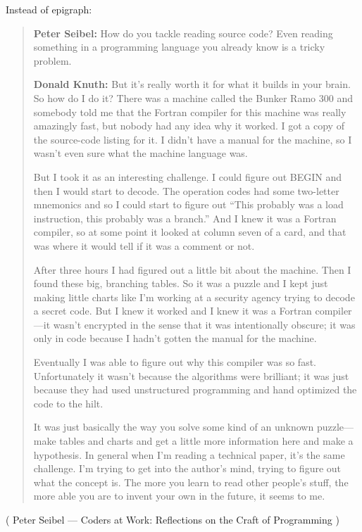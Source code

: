Instead of epigraph:

\begin{framed}
\begin{quotation}

\textbf{Peter Seibel:} How do you tackle reading source code? Even reading something in
a programming language you already know is a tricky problem.

\textbf{Donald Knuth:} But it’s really worth it for what it builds in your brain. So how do I
do it? There was a machine called the Bunker Ramo 300 and somebody told
me that the Fortran compiler for this machine was really amazingly fast, but
nobody had any idea why it worked. I got a copy of the source-code listing
for it. I didn’t have a manual for the machine, so I wasn’t even sure what the
machine language was.

But I took it as an interesting challenge. I could figure out BEGIN and then I
would start to decode. The operation codes had some two-letter
mnemonics and so I could start to figure out “This probably was a load
instruction, this probably was a branch.” And I knew it was a Fortran
compiler, so at some point it looked at column seven of a card, and that was
where it would tell if it was a comment or not.

After three hours I had figured out a little bit about the machine. Then I
found these big, branching tables. So it was a puzzle and I kept just making
little charts like I’m working at a security agency trying to decode a secret
code. But I knew it worked and I knew it was a Fortran compiler—it wasn’t
encrypted in the sense that it was intentionally obscure; it was only in code
because I hadn’t gotten the manual for the machine.

Eventually I was able to figure out why this compiler was so fast.
Unfortunately it wasn’t because the algorithms were brilliant; it was just
because they had used unstructured programming and hand optimized the
code to the hilt.

It was just basically the way you solve some kind of an unknown puzzle—
make tables and charts and get a little more information here and make a
hypothesis. In general when I’m reading a technical paper, it’s the same
challenge. I’m trying to get into the author’s mind, trying to figure out what
the concept is. The more you learn to read other people’s stuff, the more
able you are to invent your own in the future, it seems to me.

\end{quotation}
\end{framed}

( Peter Seibel --- Coders at Work: Reflections on the Craft of Programming )

